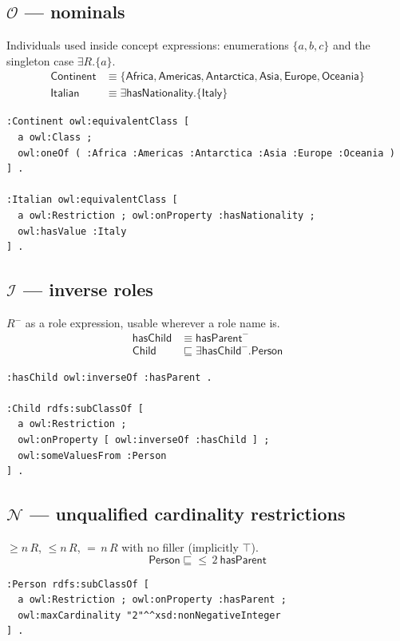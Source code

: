 \documentclass[11pt,a4paper]{article}
\newcommand{\dl}[1]{\ensuremath{\mathcal{#1}}}
\newcommand{\cn}[1]{\mathsf{#1}}      %
\newcommand{\rn}[1]{\mathsf{#1}}      %
\newcommand{\ind}[1]{\mathsf{#1}}     %
\newcommand{\sub}{\sqsubseteq}
\newcommand{\eqv}{\equiv}
\newcommand{\inv}[1]{#1^{-}}
\newcommand{\dlaxiom}[1]{%
  \begin{displaymath}#1\end{displaymath}}
\begin{document}
\subsection*{\dl{O} --- nominals}
Individuals used inside concept expressions: enumerations $\{a,b,c\}$ and the
singleton case $\exists R.\{a\}$.
\begin{align*}
  \cn{Continent} &\eqv \{\ind{Africa}, \ind{Americas}, \ind{Antarctica},
                        \ind{Asia}, \ind{Europe}, \ind{Oceania}\}\\
  \cn{Italian} &\eqv \exists \rn{hasNationality}.\{\ind{Italy}\}
\end{align*}
\begin{lstlisting}
:Continent owl:equivalentClass [
  a owl:Class ;
  owl:oneOf ( :Africa :Americas :Antarctica :Asia :Europe :Oceania )
] .

:Italian owl:equivalentClass [
  a owl:Restriction ; owl:onProperty :hasNationality ;
  owl:hasValue :Italy
] .
\end{lstlisting}

\subsection*{\dl{I} --- inverse roles}
$\inv{R}$ as a role expression, usable wherever a role name is.
\begin{align*}
  \rn{hasChild} &\eqv \inv{\rn{hasParent}}\\
  \cn{Child} &\sub \exists \inv{\rn{hasChild}}.\cn{Person}
\end{align*}
\begin{lstlisting}
:hasChild owl:inverseOf :hasParent .

:Child rdfs:subClassOf [
  a owl:Restriction ;
  owl:onProperty [ owl:inverseOf :hasChild ] ;
  owl:someValuesFrom :Person
] .
\end{lstlisting}

\subsection*{\dl{N} --- unqualified cardinality restrictions}
$\geq n\,R$, $\leq n\,R$, $=\,n\,R$ with no filler (implicitly $\top$).
\dlaxiom{\cn{Person} \sub {\leq}\,2\ \rn{hasParent}}
\begin{lstlisting}
:Person rdfs:subClassOf [
  a owl:Restriction ; owl:onProperty :hasParent ;
  owl:maxCardinality "2"^^xsd:nonNegativeInteger
] .
\end{lstlisting}
\end{document}
